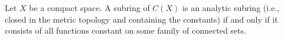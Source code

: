 Let $X$ be a compact space. A subring of $C(X)$ is an analytic subring (i.e., closed in the metric topology and containing the constants) if and only if it consists of all functions constant on some family of connected sets.
